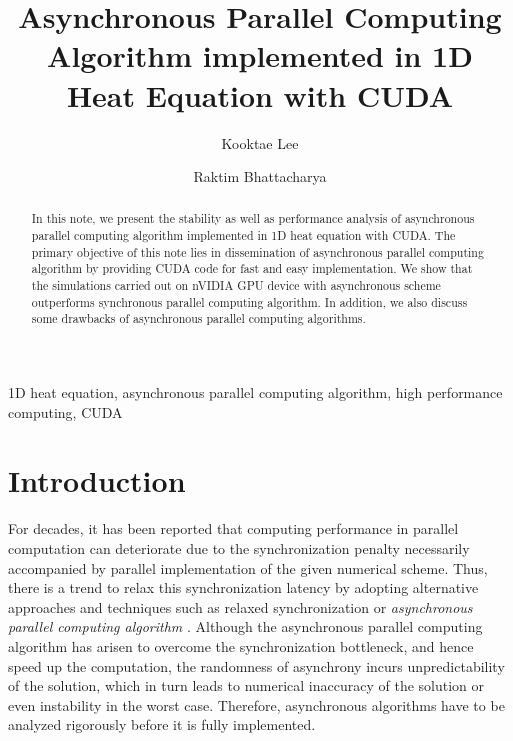 \documentclass[1p]{elsarticle}
\begin{document}
\begin{frontmatter}

\title{Asynchronous Parallel Computing Algorithm implemented in 1D Heat Equation with \textsf{CUDA}}


\author[mymainaddress]{Kooktae Lee}

\author[mymainaddress]{Raktim Bhattacharya}

\address[mymainaddress]{Laboratory for Uncertainty Quantification\\Department of Aerospace Engineering, Texas A\&M University, College Station, TX 77843-3141, USA.}




\begin{abstract}
In this note, we present the stability as well as performance analysis of asynchronous parallel computing algorithm implemented in 1D heat equation with \textsf{CUDA}. The primary objective of this note lies in dissemination of asynchronous parallel computing algorithm by providing \textsf{CUDA} code for fast and easy implementation. We show that the simulations carried out on \textsf{nVIDIA} GPU device with asynchronous scheme outperforms synchronous parallel computing algorithm. In addition, we also discuss some drawbacks of asynchronous parallel computing algorithms.
\end{abstract}

\begin{keyword}
1D heat equation, asynchronous parallel computing algorithm, high performance computing, \textsf{CUDA}
\end{keyword}

\end{frontmatter}




\section{Introduction}
For decades, it has been reported that computing performance in parallel computation can deteriorate due to the synchronization penalty necessarily accompanied by parallel implementation of the given numerical scheme. Thus, there is a trend to relax this synchronization latency by adopting alternative approaches and techniques such as relaxed synchronization \citep{kim1998relaxed, renganarayana2012programming} or \textit{asynchronous parallel computing algorithm} \citep{bertsekas1989parallel, frommer2000asynchronous, bahi2005decentralized, fox2014parallel, lee2015async, lee2015convergence}. 
Although the asynchronous parallel computing algorithm has arisen to overcome the synchronization bottleneck, and hence speed up the computation, the randomness of asynchrony incurs unpredictability of the solution, which in turn leads to numerical inaccuracy of the solution or even instability in the worst case. Therefore, asynchronous algorithms have to be analyzed rigorously before it is fully implemented.
\end{document}
